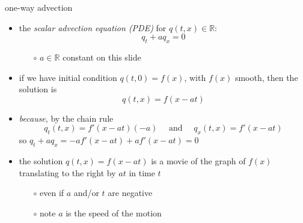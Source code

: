 \documentclass[10pt,hyperref]{beamer}
\newcommand{\RR}{\mathbb{R}}
\begin{document}
\begin{frame}{one-way advection}

\begin{itemize}
\item the \emph{scalar advection equation (PDE)} for $q(t,x) \in \RR$:
    $$q_t + a q_x=0$$

    \begin{itemize}
    \item[$\circ$] $a\in\RR$ constant on this slide
    \end{itemize}
\item if we have initial condition $q(t,0)=f(x)$, with $f(x)$ smooth, then the solution is
    $$q(t,x) = f(x-at)$$
\item \emph{because}, by the chain rule
    $$q_t(t,x) = f'(x-at) (-a) \quad \text{ and } \quad q_x(t,x) = f'(x-at)$$
so $q_t + a q_x = -a f'(x-at) + a f'(x-at) = 0$
\item the solution $q(t,x)=f(x-at)$ is a movie of the graph of $f(x)$ translating to the right by $at$ in time $t$
    \begin{itemize}
    \item[$\circ$] even if $a$ and/or $t$ are negative
    \item[$\circ$] note $a$ is the speed of the motion
    \end{itemize}
\end{itemize}
\end{frame}
\end{document}
